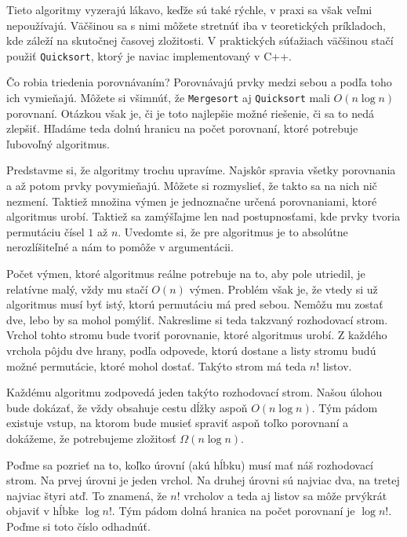 
Tieto algoritmy vyzerajú lákavo, keďže sú také rýchle, v praxi sa však veľmi nepoužívajú. Väčšinou
sa s nimi môžete stretnúť iba v teoretických príkladoch, kde záleží na skutočnej časovej zložitosti.
V praktických súťažiach väčšinou stačí použiť \texttt{Quicksort}, ktorý je naviac implementovaný v
C++.


Čo robia triedenia porovnávaním? Porovnávajú prvky medzi sebou a podľa toho ich vymieňajú. Môžete si
všimnúť, že \texttt{Mergesort} aj \texttt{Quicksort} mali $O(n\log n)$ porovnaní. Otázkou však je,
či je toto najlepšie možné riešenie, či sa to nedá zlepšiť. Hľadáme teda dolnú hranicu na počet
porovnaní, ktoré potrebuje ľubovoľný algoritmus.

Predstavme si, že algoritmy trochu upravíme. Najskôr spravia všetky porovnania a až potom prvky
povymieňajú. Môžete si rozmyslieť, že takto sa na nich nič nezmení. Taktiež množina výmen je
jednoznačne určená porovnaniami, ktoré algoritmus urobí. Taktiež sa zamýšľajme len nad postupnosťami,
kde prvky tvoria permutáciu čísel $1$ až $n$. Uvedomte si, že pre algoritmus je to absolútne
nerozlíšiteľné a nám to pomôže v argumentácii.

Počet výmen, ktoré algoritmus reálne potrebuje na to, aby pole utriedil, je relatívne malý, vždy mu stačí
$O(n)$ výmen. Problém však je, že vtedy si už algoritmus musí byť istý, ktorú permutáciu má pred
sebou. Nemôžu mu zostať dve, lebo by sa mohol pomýliť. Nakreslime si teda takzvaný rozhodovací
strom. Vrchol tohto stromu bude tvoriť porovnanie, ktoré algoritmus urobí. Z každého vrchola pôjdu
dve hrany, podľa odpovede, ktorú dostane a listy stromu budú možné permutácie, ktoré mohol dostať.
Takýto strom má teda $n!$ listov.

Každému algoritmu zodpovedá jeden takýto rozhodovací strom. Našou úlohou bude dokázať, že vždy
obsahuje cestu dĺžky aspoň $O(n\log n)$. Tým pádom existuje vstup, na ktorom bude musieť spraviť
aspoň toľko porovnaní a dokážeme, že potrebujeme zložitosť $\Omega (n\log n)$.

Poďme sa pozrieť na to, koľko úrovní (akú hĺbku) musí mať náš rozhodovací strom. Na prvej úrovni je
jeden vrchol. Na druhej úrovni sú najviac dva, na tretej najviac štyri atď. To znamená, že $n!$
vrcholov a teda aj listov sa môže prvýkrát objaviť v hĺbke $\log n!$. Tým pádom dolná hranica na
počet porovnaní je $\log n!$. Poďme si toto číslo odhadnúť.

